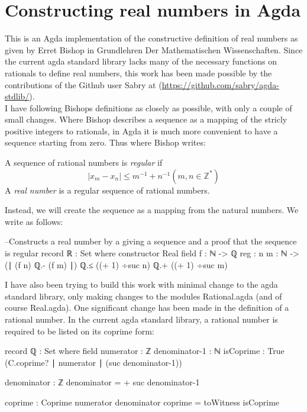 \documentclass[11pt,a4paper]{article}
\begin{document}
\section{Constructing real numbers in Agda}\label{sec: reals in agda}

This is an Agda implementation of the constructive definition of real numbers as given by Erret Bishop in Grundlehren Der Mathematischen Wissenschaften. Since the current agda standard library lacks many of the necessary functions on rationals to define real numbers, this work has been made possible by the contributions of the Github user Sabry at (\url{https://github.com/sabry/agda-stdlib/}).\\

I have following Bishops definitions as closely as possible, with only a couple of small changes. Where Bishop describes a sequence as a mapping of the stricly positive integers to rationals, in Agda it is much more convenient to have a sequence starting from zero. Thus where Bishop writes:
\begin{blockquote}
A sequence of rational numbers is \textit{regular} if 
$$| x_m - x_n | \leq m^{-1} + n^{-1} (m, n \in \mathbb{Z}^*)$$
A \textit{real number} is a regular sequence of rational numbers.
\end{blockquote}

Instead, we will create the sequence as a mapping from the natural numbers. We write as follows:
\begin{code}
--Constructs a real number by a giving a sequence and a proof that the sequence is regular
record ℝ : Set where
  constructor Real
  field
    f : ℕ -> ℚ
    reg : {n m : ℕ} -> (∣ (f n) ℚ.- (f m) ∣) ℚ.≤ ((+ 1) ÷suc n) ℚ.+ ((+ 1) ÷suc m)

\end{code}

I have also been trying to build this work with minimal change to the agda standard library, only making changes to the modules Rational.agda (and of course Real.agda). One significant change has been made in the definition of a rational number. In the current agda standard library, a rational number is required to be listed on its coprime form:
\begin{code}

record ℚ : Set where
  field
    numerator     : ℤ
    denominator-1 : ℕ
    isCoprime     : True (C.coprime? ∣ numerator ∣ (suc denominator-1))

  denominator : ℤ
  denominator = + suc denominator-1

  coprime : Coprime numerator denominator
  coprime = toWitness isCoprime
\end{code}
\end{document}

